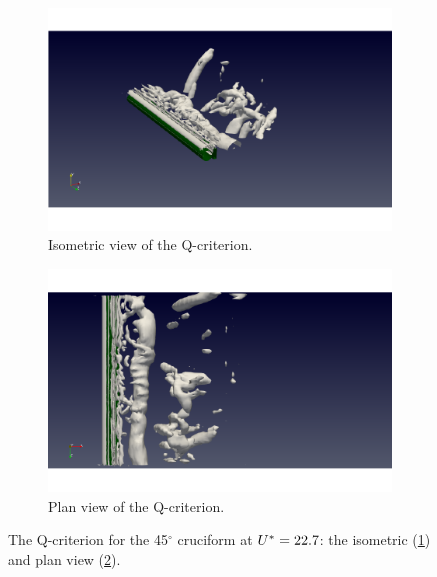 \documentclass[oneside]{utmthesis}
\begin{document}
\begin{figure}[H]
  \centering
  \begin{subfigure}[h]{0.48\textwidth}
    \includegraphics[width=\textwidth,trim={1.5cm 0 3cm 0},clip]{figs/qIso000U10}
    \caption{Isometric view of the Q-criterion.}
    \label{fig:qIso000U10}
  \end{subfigure}
  \hfill
  \begin{subfigure}[h]{0.48\textwidth}
    \includegraphics[width=\textwidth,trim={1.5cm 0 3cm 0},clip]{figs/qTop000U10}
    \caption{Plan view of the Q-criterion.}
    \label{fig:qTop000U10}
  \end{subfigure}

  \caption{The Q-criterion for the 45$^{\circ}$ cruciform at $U^{*} = 22.7$: the isometric (\ref{fig:qIso000U10}) and plan view (\ref{fig:qTop000U10}).} \label{fig:qCrit000U10}
\end{figure}
\end{document}
